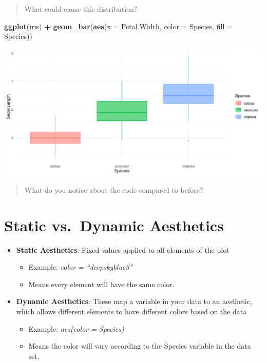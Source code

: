 \documentclass[
]{book}
\newenvironment{Shaded}{\begin{snugshade}}{\end{snugshade}}
\newcommand{\AttributeTok}[1]{\textcolor[rgb]{0.13,0.29,0.53}{#1}}
\newcommand{\FunctionTok}[1]{\textcolor[rgb]{0.13,0.29,0.53}{\textbf{#1}}}
\newcommand{\NormalTok}[1]{#1}
\newcommand{\SpecialCharTok}[1]{\textcolor[rgb]{0.81,0.36,0.00}{\textbf{#1}}}
\providecommand{\tightlist}{%
  \setlength{\itemsep}{0pt}\setlength{\parskip}{0pt}}
\begin{document}
\begin{quote}
What could cause this distribution?
\end{quote}

\begin{Shaded}
\begin{Highlighting}[]
\FunctionTok{ggplot}\NormalTok{(iris) }\SpecialCharTok{+} 
  \FunctionTok{geom\_bar}\NormalTok{(}\FunctionTok{aes}\NormalTok{(}\AttributeTok{x =}\NormalTok{ Petal.Width, }\AttributeTok{color =}\NormalTok{ Species, }\AttributeTok{fill =}\NormalTok{ Species))}
\end{Highlighting}
\end{Shaded}

\begin{flushleft}\includegraphics{_main_files/figure-html/unnamed-chunk-37-1} \end{flushleft}

\begin{quote}
What do you notice about the code compared to before?
\end{quote}

\section{Static vs.~Dynamic Aesthetics}\label{static-vs.-dynamic-aesthetics}

\begin{itemize}
\tightlist
\item
  \textbf{Static Aesthetics}: Fixed values applied to all elements of the plot

  \begin{itemize}
  \tightlist
  \item
    Example: \emph{color = ``deepskyblue3''}
  \item
    Means every element will have the same color.
  \end{itemize}
\item
  \textbf{Dynamic Aesthetics}: These map a variable in your data to an aesthetic, which allows different elements to have different colors based on the data

  \begin{itemize}
  \tightlist
  \item
    Example: \emph{aes(color = Species)}
  \item
    Means the color will vary according to the Species variable in the data set.
  \end{itemize}
\end{itemize}
\end{document}
